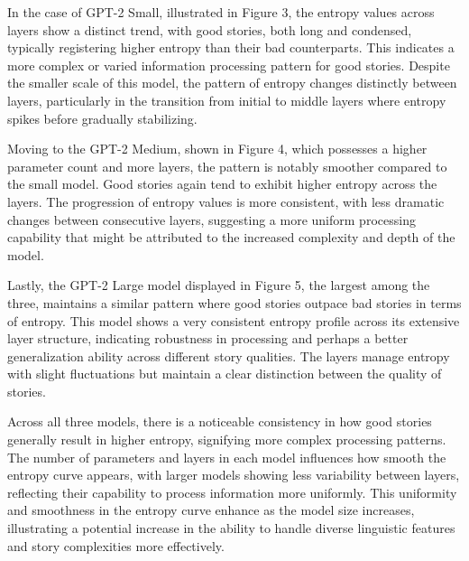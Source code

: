 \documentclass{article}
\begin{document}
In the case of GPT-2 Small, illustrated in Figure 3, the entropy values across layers show a distinct trend, with good stories, both long and condensed, typically registering higher entropy than their bad counterparts. This indicates a more complex or varied information processing pattern for good stories. Despite the smaller scale of this model, the pattern of entropy changes distinctly between layers, particularly in the transition from initial to middle layers where entropy spikes before gradually stabilizing.

Moving to the GPT-2 Medium, shown in Figure 4, which possesses a higher parameter count and more layers, the pattern is notably smoother compared to the small model. Good stories again tend to exhibit higher entropy across the layers. The progression of entropy values is more consistent, with less dramatic changes between consecutive layers, suggesting a more uniform processing capability that might be attributed to the increased complexity and depth of the model.

Lastly, the GPT-2 Large model displayed in Figure 5, the largest among the three, maintains a similar pattern where good stories outpace bad stories in terms of entropy. This model shows a very consistent entropy profile across its extensive layer structure, indicating robustness in processing and perhaps a better generalization ability across different story qualities. The layers manage entropy with slight fluctuations but maintain a clear distinction between the quality of stories.

Across all three models, there is a noticeable consistency in how good stories generally result in higher entropy, signifying more complex processing patterns. The number of parameters and layers in each model influences how smooth the entropy curve appears, with larger models showing less variability between layers, reflecting their capability to process information more uniformly. This uniformity and smoothness in the entropy curve enhance as the model size increases, illustrating a potential increase in the ability to handle diverse linguistic features and story complexities more effectively.
\end{document}
